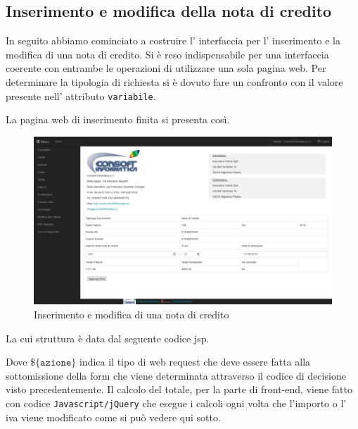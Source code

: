 \documentclass[12pt]{book}
\begin{document}
\subsection{Inserimento e modifica della nota di credito}
In seguito abbiamo cominciato a costruire l' interfaccia per l' inserimento 
e la modifica di una nota di credito.
Si è reso indispensabile per una interfaccia coerente con entrambe le operazioni
di utilizzare una sola pagina web.
Per determinare la tipologia di richiesta si è dovuto fare un confronto 
con il valore presente nell' attributo \texttt{variabile}.

La pagina web di inserimento finita si presenta così.
\begin{figure}[H]
    \centering
    \includegraphics[scale=0.4]{img/inserimento_nota_credito}
    \caption{Inserimento e modifica di una nota di credito}\label{fig:insert}
\end{figure}
La cui struttura è data dal seguente codice jsp.

Dove \(\texttt{\$\{azione\}}\) indica il tipo di web request che deve essere
fatta alla sottomissione della form che viene determinata attraverso il 
codice di decisione visto precedentemente.
Il calcolo del totale, per la parte di front-end, viene fatto 
con codice \texttt{Javascript/jQuery} che esegue i calcoli ogni 
volta che l'importo o l' iva viene modificato come si può vedere qui sotto.

\end{document}
